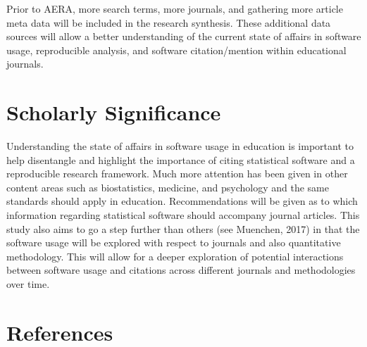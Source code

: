 \documentclass[english,man]{apa6}
\theoremstyle{definition}
\theoremstyle{definition}
\theoremstyle{definition}
\theoremstyle{remark}
\begin{document}
Prior to AERA, more search terms, more journals, and gathering more
article meta data will be included in the research synthesis. These
additional data sources will allow a better understanding of the current
state of affairs in software usage, reproducible analysis, and software
citation/mention within educational journals.

\hypertarget{scholarly-significance}{%
\section{Scholarly Significance}\label{scholarly-significance}}

Understanding the state of affairs in software usage in education is
important to help disentangle and highlight the importance of citing
statistical software and a reproducible research framework. Much more
attention has been given in other content areas such as biostatistics,
medicine, and psychology and the same standards should apply in
education. Recommendations will be given as to which information
regarding statistical software should accompany journal articles. This
study also aims to go a step further than others (see Muenchen, 2017) in
that the software usage will be explored with respect to journals and
also quantitative methodology. This will allow for a deeper exploration
of potential interactions between software usage and citations across
different journals and methodologies over time.

\hypertarget{references}{%
\section{References}\label{references}}

\setlength{\parindent}{-0.5in}
\setlength{\leftskip}{0.5in}
\end{document}
